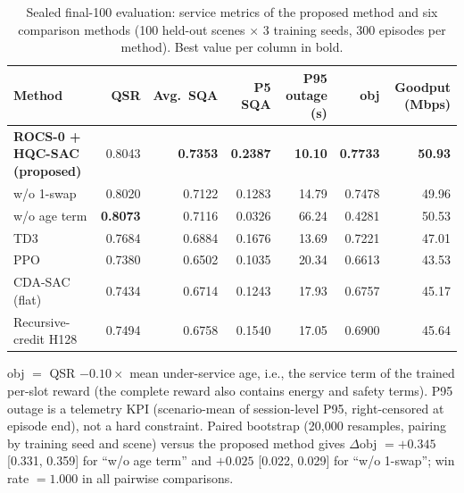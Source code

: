 \begin{table}[t]
\centering
\caption{Sealed final-100 evaluation: service metrics of the proposed method and six comparison methods (100 held-out scenes $\times$ 3 training seeds, 300 episodes per method). Best value per column in bold.}
\label{tab:main}
\begin{tabular}{@{}lrrrrrr@{}}
\toprule
Method & QSR & Avg.\ SQA & P5 SQA & P95 outage (s) & obj & Goodput (Mbps) \\
\midrule
\textbf{ROCS-0 + HQC-SAC (proposed)} & 0.8043 & \textbf{0.7353} & \textbf{0.2387} & \textbf{10.10} & \textbf{0.7733} & \textbf{50.93} \\
w/o 1-swap & 0.8020 & 0.7122 & 0.1283 & 14.79 & 0.7478 & 49.96 \\
w/o age term & \textbf{0.8073} & 0.7116 & 0.0326 & 66.24 & 0.4281 & 50.53 \\
TD3 & 0.7684 & 0.6884 & 0.1676 & 13.69 & 0.7221 & 47.01 \\
PPO & 0.7380 & 0.6502 & 0.1035 & 20.34 & 0.6613 & 43.53 \\
CDA-SAC (flat) & 0.7434 & 0.6714 & 0.1243 & 17.93 & 0.6757 & 45.17 \\
Recursive-credit H128 & 0.7494 & 0.6758 & 0.1540 & 17.05 & 0.6900 & 45.64 \\
\bottomrule
\end{tabular}
\begin{flushleft}\footnotesize
obj $=$ QSR $- 0.10\times$ mean under-service age, i.e., the service term of the trained per-slot reward (the complete reward also contains energy and safety terms). P95 outage is a telemetry KPI (scenario-mean of session-level P95, right-censored at episode end), not a hard constraint. Paired bootstrap (20{,}000 resamples, pairing by training seed and scene) versus the proposed method gives $\Delta$obj $=+0.345$ [0.331, 0.359] for ``w/o age term'' and $+0.025$ [0.022, 0.029] for ``w/o 1-swap''; win rate $=1.000$ in all pairwise comparisons.
\end{flushleft}
\end{table}

